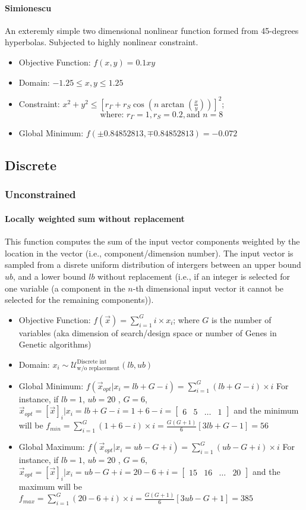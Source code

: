 \paragraph{Simionescu}
An exteremly simple two dimensional nonlinear function formed from 45-degrees hyperbolas. Subjected to highly nonlinear constraint.
\begin{itemize}
	\item Objective Function: $f(x,y) = 0.1xy$
	\item Domain: $-1.25 \leq x,y \leq 1.25$
	\item Constraint: $x^2 + y^2 \leq \left[r_{\Gamma}+r_S\cos\left(n \arctan(\frac{x}{y})\right)\right]^2 $; \[ \text{where: } r_{\Gamma}=1, r_S = 0.2, \text{and } n=8 \]
	\item Global Minimum: $f(\pm 0.84852813,\mp0.84852813) = -0.072$
\end{itemize}
\subsection{Discrete}
\subsubsection{Unconstrained}
\paragraph{Locally weighted sum without replacement}
This function computes the sum of the input vector components weighted by the location in the vector (i.e., component/dimension number). The input vector is sampled from a disrete uniform distribution of intergers between an upper bound $ub$, and a lower bound $lb$ without replacement (i.e., if an integer is selected for one variable (a component in the $n$-th dimensional input vector it cannot be selected for the remaining components)).
\begin{itemize}
	\item Objective Function: $f(\vec{x}) = \sum_{i=1}^{G}i \times x_i$; where $G$ is the number of variables (aka dimension of search/design space or number of Genes in Genetic algorithms)
	\item Domain: $x_i \sim \mathcal{U}^{\text{Discrete int}}_{\text{w/o replacement}} (lb,ub)$
	\item Global Minimum: $f(\vec{x}_{opt}|x_i = lb + G - i) = \sum_{i=1}^{G} (lb + G -i) \times i$
	For instance, if $lb =1$, $ub=20$ , $G=6$, $\vec{x}_{opt} = [\vec{x}]_i | x_i = lb + G - i = 1+6-i = \begin{bmatrix}
	6 & 5 & \dots & 1 \end{bmatrix}$ and the minimum will be $f_{min} = \sum_{i=1}^{G} (1 + 6 -i) \times i = \frac{G(G+1)}{6}[3lb+G-1] = 56$
	\item Global Maximum: $f(\vec{x}_{opt}|x_i = ub - G + i) = \sum_{i=1}^{G} (ub - G +i) \times i$
	For instance, if $lb =1$, $ub=20$ , $G=6$, $\vec{x}_{opt} = [\vec{x}]_i | x_i = ub - G + i = 20-6+i = \begin{bmatrix}
	15 & 16 & \dots & 20 \end{bmatrix}$ and the maximum will be $f_{max} = \sum_{i=1}^{G} (20 - 6 +i) \times i = \frac{G(G+1)}{6}[3ub-G+1] = 385$
\end{itemize}

